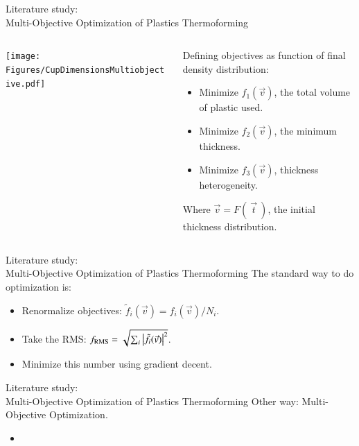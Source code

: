 \documentclass{beamer}
\begin{document}
	\begin{frame}{Literature study:\\ Multi-Objective Optimization of Plastics Thermoforming}
		\begin{columns}
			\begin{column}{0.5\textwidth}
				\texttt{[image: Figures/CupDimensionsMultiobjective.pdf]}
			\end{column}
			\begin{column}{0.5\textwidth}
				Defining objectives as function of final density distribution:
				\begin{itemize}
					\item Minimize $f_1(\vec v)$, the total volume of plastic used.
					\item Minimize $f_2(\vec v)$, the minimum thickness.
					\item Minimize $f_3(\vec v)$, thickness heterogeneity.
				\end{itemize}
				Where $\vec{v}=F(\:\vec t\:)$, the initial thickness distribution.
			\end{column}
		\end{columns}
	\end{frame}

	\begin{frame}{Literature study:\\ Multi-Objective Optimization of Plastics Thermoforming}
		The standard way to do optimization is:
		\begin{itemize}
			\item Renormalize objectives: $\tilde f_i(\vec v)=f_i(\vec v)/N_i$.
			\item Take the RMS: $f_{\text{RMS}}=\sqrt{\sum_{i}\abs{\tilde{f}_i(\vec{v})}^2}$.
			\item Minimize this number using gradient decent.
		\end{itemize}
	\end{frame}

	\begin{frame}{Literature study:\\ Multi-Objective Optimization of Plastics Thermoforming}
		Other way: Multi-Objective Optimization.
		\begin{itemize}
			\item 
		\end{itemize}
	\end{frame}

	\begin{frame}
		\printbibliography
	\end{frame}
\end{document}
